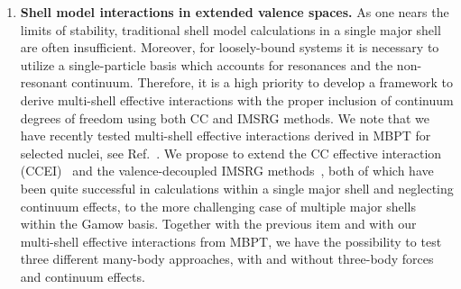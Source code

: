 \begin{enumerate}
\item {\bf Shell model interactions in extended valence spaces.} 
As one nears the limits of stability, traditional shell model calculations in a
single major shell are often insufficient. Moreover, for loosely-bound
systems it is necessary to utilize a single-particle basis which
accounts for resonances and the non-resonant continuum. Therefore, it
is a high priority to develop a framework to derive
multi-shell effective interactions with the proper inclusion of
continuum degrees of freedom using both CC and IMSRG methods. We note that we have recently tested multi-shell
effective interactions derived in MBPT for selected nuclei, see
Ref.~\cite{Tsunoda:2013bla,Tsunoda:2016fjh}. We propose to extend the CC effective interaction (CCEI)~\cite{Jansen:2014qf,Jansen:2015ngw} and the valence-decoupled
IMSRG methods~\cite{Bogner:2014tg,Stroberg:2015ymf,Stroberg:2016ung}, both of which have been quite successful in calculations within a single major shell and neglecting continuum effects, to the more
challenging case of multiple major shells within the Gamow basis.  Together with the previous item and with our
multi-shell effective interactions from MBPT, we have the possibility to test three different many-body approaches, with and without three-body forces and continuum effects.



\end{enumerate}
